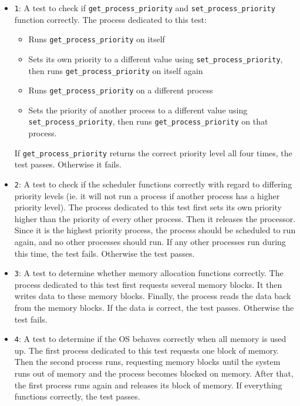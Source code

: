 \documentclass[12pt]{report}
\begin{document}
\begin{itemize}
	\item \texttt{1}: A test to check if \texttt{get_process_priority} and \texttt{set_process_priority} function correctly.  The process dedicated to this test:
    	\begin{itemize}
			\item Runs \texttt{get_process_priority} on itself
            \item Sets its own priority to a different value using \texttt{set_process_priority}, then runs \texttt{get_process_priority} on itself again
            \item Runs \texttt{get_process_priority} on a different process
            \item Sets the priority of another process to a different value using \texttt{set_process_priority}, then runs \texttt{get_process_priority} on that process.
		\end{itemize}
    	If \texttt{get_process_priority} returns the correct priority level all four times, the test passes.  Otherwise it fails.
	\item \texttt{2}: A test to check if the scheduler functions correctly with regard to differing priority levels (ie. it will not run a process if another process has a higher priority level).  The process dedicated to this test first sets its own priority higher than the priority of every other process.  Then it releases the processor.  Since it is the highest priority process, the process should be scheduled to run again, and no other processes should run.  If any other processes run during this time, the test fails.  Otherwise the test passes.
	\item \texttt{3}: A test to determine whether memory allocation functions correctly.  The process dedicated to this test first requests several memory blocks.  It then writes data to these memory blocks.  Finally, the process reads the data back from the memory blocks.  If the data is correct, the test passes.  Otherwise the test fails.
	\item \texttt{4}: A test to determine if the OS behaves correctly when all memory is used up.  The first process dedicated to this test requests one block of memory.  Then the second process runs, requesting memory blocks until the system runs out of memory and the process becomes blocked on memory.  After that, the first process runs again and releases its block of memory.  If everything functions correctly, the test passes.
\end{itemize}
\end{document}
